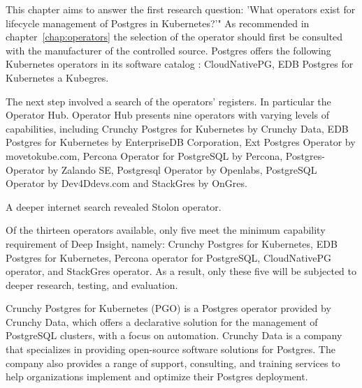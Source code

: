 \label{chap:searchForoperators}
This chapter aims to answer the first research question: 'What operators exist for lifecycle management of Postgres in Kubernetes?'"
As recommended in chapter~\ref{chap:operators} the selection of the operator should first be consulted with the manufacturer of the controlled source. Postgres offers the following Kubernetes operators in its software catalog \cite{docuPgSwCatalogue}: CloudNativePG, EDB Postgres for Kubernetes a Kubegres.

The next step involved a search of the operators' registers. In particular the Operator Hub. \cite{operatorHubPGSearch} Operator Hub presents nine operators with varying levels of capabilities, including Crunchy Postgres for Kubernetes by Crunchy Data, EDB Postgres for Kubernetes by EnterpriseDB Corporation, Ext Postgres Operator by movetokube.com, Percona Operator for PostgreSQL by Percona, Postgres-Operator by Zalando SE, Postgresql Operator by Openlabs, PostgreSQL Operator by Dev4Ddevs.com and StackGres by OnGres.

A deeper internet search revealed Stolon operator. \cite{PalarkComparingKubernetes}

Of the thirteen operators available, only five meet the minimum capability requirement of Deep Insight, namely: Crunchy Postgres for Kubernetes, EDB Postgres for Kubernetes, Percona operator for PostgreSQL, CloudNativePG operator, and StackGres operator. As a result, only these five will be subjected to deeper research, testing, and evaluation.

\pagebreak
{}
Crunchy Postgres for Kubernetes (PGO) is a Postgres operator provided by Crunchy Data, which offers a declarative solution for the management of PostgreSQL clusters, with a focus on automation.
Crunchy Data is a company that specializes in providing open-source software solutions for Postgres. The company also provides a range of support, consulting, and training services to help organizations implement and optimize their Postgres deployment. \cite{Crunchy}

